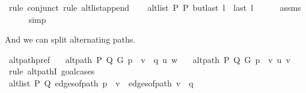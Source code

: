 \begin{isabellebody}
%
\endisadelimproof
%
\isatagproof
{}\isamarkupfalse%
\ {\isacharparenleft}{\kern0pt}rule\ conjunct{}{\isacharcomma}{\kern0pt}\ rule\ alt{\isacharunderscore}{\kern0pt}list{\isacharunderscore}{\kern0pt}append{\isacharunderscore}{\kern0pt}{}{\isacharparenright}{\kern0pt}\isanewline
\ \ \isamarkupfalse%
\ {\isachardoublequoteopen}alt{\isacharunderscore}{\kern0pt}list\ P{}\ P{}\ {\isacharparenleft}{\kern0pt}butlast\ l\ {\isacharat}{\kern0pt}\ {\isacharbrackleft}{\kern0pt}last\ l{\isacharbrackright}{\kern0pt}{\isacharparenright}{\kern0pt}{\isachardoublequoteclose}\isanewline
\ \ \ \ \isamarkupfalse%
\ assms\isanewline
\ \ \ \ \isamarkupfalse%
\ simp\isanewline
{}\isamarkupfalse%
%
\endisatagproof
{\isafoldproof}%
%
\isadelimproof
%
\endisadelimproof
%
\begin{isamarkuptext}%
And we can split alternating paths.%
\end{isamarkuptext}\isamarkuptrue%
\isamarkupfalse%
\ alt{\isacharunderscore}{\kern0pt}path{\isacharunderscore}{\kern0pt}pref{\isacharcolon}{\kern0pt}\isanewline
\ \ \ {\isachardoublequoteopen}alt{\isacharunderscore}{\kern0pt}path\ P\ Q\ G\ {\isacharparenleft}{\kern0pt}p\ {\isacharat}{\kern0pt}\ v\ {\isacharhash}{\kern0pt}\ q{\isacharparenright}{\kern0pt}\ u\ w{\isachardoublequoteclose}\isanewline
\ \ \ {\isachardoublequoteopen}alt{\isacharunderscore}{\kern0pt}path\ P\ Q\ G\ {\isacharparenleft}{\kern0pt}p\ {\isacharat}{\kern0pt}\ {\isacharbrackleft}{\kern0pt}v{\isacharbrackright}{\kern0pt}{\isacharparenright}{\kern0pt}\ u\ v{\isachardoublequoteclose}\isanewline
%
\isadelimproof
%
\endisadelimproof
%
\isatagproof
{}\isamarkupfalse%
\ {\isacharparenleft}{\kern0pt}rule\ alt{\isacharunderscore}{\kern0pt}pathI{\isacharcomma}{\kern0pt}\ goal{\isacharunderscore}{\kern0pt}cases{\isacharparenright}{\kern0pt}\isanewline
\ \ \isamarkupfalse%
\ {}\isanewline
\ \ \isamarkupfalse%
\ {\isachardoublequoteopen}alt{\isacharunderscore}{\kern0pt}list\ P\ Q\ {\isacharparenleft}{\kern0pt}edges{\isacharunderscore}{\kern0pt}of{\isacharunderscore}{\kern0pt}path\ {\isacharparenleft}{\kern0pt}p\ {\isacharat}{\kern0pt}\ {\isacharbrackleft}{\kern0pt}v{\isacharbrackright}{\kern0pt}{\isacharparenright}{\kern0pt}\ {\isacharat}{\kern0pt}\ edges{\isacharunderscore}{\kern0pt}of{\isacharunderscore}{\kern0pt}path\ {\isacharparenleft}{\kern0pt}v\ {\isacharhash}{\kern0pt}\ q{\isacharparenright}{\kern0pt}{\isacharparenright}{\kern0pt}{\isachardoublequoteclose}\isanewline

\end{isabellebody}
